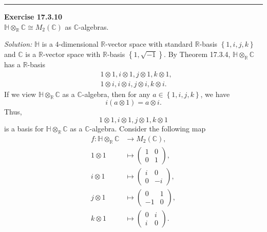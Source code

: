 \documentclass[a4paper, 12pt]{article}
\newenvironment{problem}[2][Exercise]
    { \begin{mdframed}[backgroundcolor=gray!20] \textbf{#1 #2} \\}
    {  \end{mdframed}}
\newenvironment{solution}
    {\textit{Solution:}}
    {}
\begin{document}
\noindent\rule{7in}{2.8pt}
\begin{problem}{17.3.10}
\(\mathbb{H}\otimes_\mathbb{R}\mathbb{C}\cong M_2(\mathbb{C})\) as \(\mathbb{C}\)-algebras. 
\end{problem}
\begin{solution}
\(\mathbb{H}\) is a \(4\)-dimensional \(\mathbb{R}\)-vector space with standard \(\mathbb{R}\)-basis \(\left\{ 1,i,j,k \right\}\) and \(\mathbb{C}\) is a \(\mathbb{R}\)-vector 
space with \(\mathbb{R}\)-basis \(\left\{ 1,\sqrt{-1} \right\}\). By Theorem 17.3.4, \(\mathbb{H}\otimes_\mathbb{R}\mathbb{C}\) has a \(\mathbb{R}\)-basis 
\begin{align*}
	&1\otimes 1,i\otimes 1,j\otimes 1,k\otimes 1,\\ 
    &1\otimes i,i\otimes i,j\otimes i,k\otimes i.
\end{align*}
If we view \(\mathbb{H}\otimes_\mathbb{R}\mathbb{C}\) as a \(\mathbb{C}\)-algebra, then for any \(a\in\left\{ 1,i,j,k \right\}\), we have 
\[i(a\otimes 1)=a\otimes i.\]
Thus, 
\[1\otimes 1,i\otimes 1,j\otimes 1,k\otimes 1\]
is a basis for \(\mathbb{H}\otimes_\mathbb{R}\mathbb{C}\) as a \(\mathbb{C}\)-algebra. Consider the following map 
\begin{align*}
	f:\mathbb{H}\otimes_\mathbb{R}\mathbb{C}&\rightarrow M_2(\mathbb{C}),\\ 
	1\otimes 1&\mapsto \begin{pmatrix}
		1&0\\ 
		0&1
	\end{pmatrix},\\[5pt]
	i\otimes 1&\mapsto \begin{pmatrix}
		i&0\\ 
		0&-i
	\end{pmatrix},\\[5pt] 
	j\otimes 1&\mapsto \begin{pmatrix}
		0&1\\ 
		-1&0
	\end{pmatrix},\\[5pt]
    k\otimes 1&\mapsto \begin{pmatrix}
		0&i\\ 
		i&0
	\end{pmatrix}.
\end{align*}

\end{solution}
\end{document}
